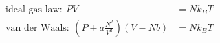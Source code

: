 

\vspace*{\fill}
\centering

\begin{align*}
    \mbox{ideal gas law}:~ PV &= Nk_{B}T \\
    \mbox{van der Waals}:~ (P + a\frac{N^2}{V^2})(V - Nb) &= Nk_{B}T
\end{align*}

\centering
\vspace*{\fill}

